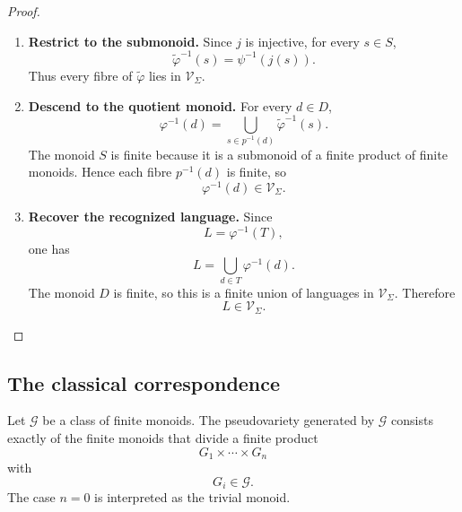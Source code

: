 \begin{proof}
\begin{enumerate}
        \item \textbf{Restrict to the submonoid.}
        Since \(j\) is injective, for every \(s\in S\),
        \[
            \widetilde\varphi^{-1}(s)
            =
            \psi^{-1}(j(s)).
        \]
        Thus every fibre of \(\widetilde\varphi\) lies in
        \(\mathcal V_\Sigma\).

        \item \textbf{Descend to the quotient monoid.}
        For every \(d\in D\),
        \[
            \varphi^{-1}(d)
            =
            \bigcup_{s\in p^{-1}(d)}
            \widetilde\varphi^{-1}(s).
        \]
        The monoid \(S\) is finite because it is a submonoid of a finite
        product of finite monoids. Hence each fibre \(p^{-1}(d)\) is finite,
        so
        \[
            \varphi^{-1}(d)
            \in
            \mathcal V_\Sigma.
        \]

        \item \textbf{Recover the recognized language.}
        Since
        \[
            L=\varphi^{-1}(T),
        \]
        one has
        \[
            L
            =
            \bigcup_{d\in T}
            \varphi^{-1}(d).
        \]
        The monoid \(D\) is finite, so this is a finite union of languages in
        \(\mathcal V_\Sigma\). Therefore
        \[
            L\in\mathcal V_\Sigma.
        \]
    \end{enumerate}
\end{proof}

\subsection{The classical correspondence}
\label{subsec:to-classical-correspondence}

\begin{lemma}
\label{lem:to-generated-pseudovariety-normal-form}
    Let \(\mathcal G\) be a class of finite monoids. The pseudovariety
    generated by \(\mathcal G\) consists exactly of the finite monoids that
    divide a finite product
    \[
        G_1\times\cdots\times G_n
    \]
    with
    \[
        G_i\in\mathcal G.
    \]
    The case \(n=0\) is interpreted as the trivial monoid.
\end{lemma}

